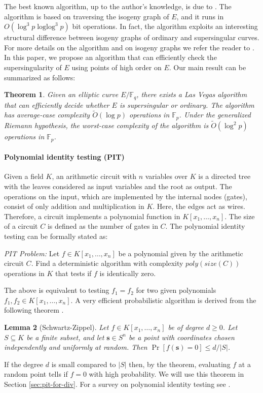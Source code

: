 \documentclass[12pt]{article}
\theoremstyle{plain}
\newtheorem{theorem}{Theorem}
\newtheorem{lemma}[theorem]{Lemma}
\theoremstyle{definition}
\newcommand{\abs}[1]{\left\vert#1\right\vert}
\newcommand{\tildO}{\tilde{O}}
\DeclareMathOperator{\loglog}{loglog}
\def\F{\ensuremath{\mathbb{F}}}
\begin{document}
The best known algorithm, up to the author's knowledge, is due to \cite{sutherland2012}. The 
algorithm is based on traversing the isogeny graph of $E$, and it runs in $O(\log^3p \loglog^3p)$ 
bit operations. In fact, the algorithm exploits an interesting structural difference between 
isogeny graphs of ordinary and supersingular curves. For more details on the algorithm and on 
isogeny graphs we refer the reader to \cite{sutherland2012, kohel1996}. In this paper, we propose 
an algorithm that can efficiently check the supersingularity of $E$ using points of high order on 
$E$. Our main result can be summarized as follows:
\begin{theorem}
	\label{theo:main}
	Given an elliptic curve $E/\F_q$, there exists a Las Vegas algorithm that can efficiently 
	decide whether $E$ is supersingular or ordinary. The algorithm has average-case complexity 
	$\tildO(\log p)$ operations in $\F_p$. Under the generalized Riemann hypothesis, the worst-case 
	complexity of the algorithm is $\tildO(\log^2 p)$ operations in $\F_p$.
\end{theorem}

\paragraph{Polynomial identity testing (PIT)}
Given a field $K$, an arithmetic circuit with $n$ variables over $K$ is a directed tree with the 
leaves considered as input variables and the root as output. The operations on the input, which are 
implemented by the internal nodes (gates), consist of only addition and multiplication in $K$. 
Here, the edges act as wires. Therefore, a circuit implements a polynomial function in $K[x_1, 
\dots, x_n]$. The size of a circuit $C$ is defined as the number of gates in $C$. The polynomial 
identity testing can be formally stated as: 

\vspace*{2mm}

\textit{PIT Problem:} Let $f \in K[x_1, \dots, x_n]$ be a polynomial given by the arithmetic 
circuit $C$. Find a deterministic algorithm with complexity $poly(size(C))$ operations in $K$ that 
tests if $f$ is identically zero.

\vspace*{2mm}

The above is equivalent to testing $f_1 = f_2$ for two given polynomials $f_1, f_2 \in K[x_1, 
\dots, x_n]$. A very efficient probabilistic algorithm is derived from the following theorem 
\cite{schwartz1980,zippel1979}.
\begin{lemma}[Schwartz-Zippel]
	\label{lemma:Schwartz-Zippel}
	Let $f \in K[x_1, \dots, x_n]$ be of degree $d \ge 0$. Let $S \subseteq K$ be a finite subset, 
	and let $\mathbf{s} \in S^n$ be a point with coordinates chosen independently and uniformly at 
	random. Then $\Pr[f(\mathbf{s}) = 0] \le d / \abs{S}$.
\end{lemma}
If the degree $d$ is small compared to $\abs{S}$ then, by the theorem, evaluating $f$ at a random 
point tells if $f = 0$ with high probability. We will use this theorem in Section 
\ref{sec:pit-for-div}. For a survey on polynomial identity testing see \cite{saxena2009}.
\end{document}
